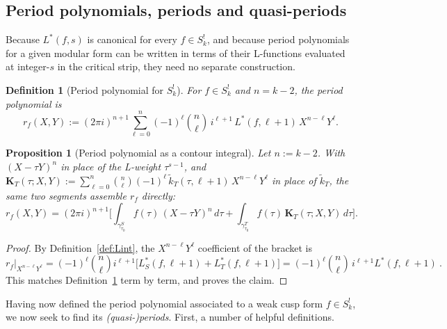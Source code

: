 \documentclass[11pt]{article}
\newtheorem{proposition}[theorem]{Proposition}
\newtheorem{definition}[theorem]{Definition}
\newcommand{\tk}{\widetilde{k}_T}
\begin{document}
\subsection{Period polynomials, periods and quasi-periods}

Because $L^*(f,s)$ is canonical for every $f\in S^!_k$, and because period polynomials 
for a given modular form can be written in terms of their L-functions evaluated at integer-$s$ 
in the critical strip, they need no separate construction.

\begin{definition}[Period polynomial for $S_k^!$]\label{def:rf}
For $f\in S^!_k$ and $n=k-2$, the \emph{period polynomial} is
\begin{equation}
r_f(X,Y):=(2\pi i)^{n+1}\sum_{\ell=0}^{n}(-1)^\ell\binom{n}{\ell}\,i^{\ell+1}\,L^*(f,\ell+1)\,X^{n-\ell}Y^\ell.
\end{equation}
\end{definition}

\begin{proposition}[Period polynomial as a contour integral]\label{prop:periodint}
Let $n:=k-2$. With $(X-\tau Y)^n$ in place of the L-weight $\tau^{s-1}$, and
$\mathbf K_T(\tau;X,Y):=\sum_{\ell=0}^{n}\binom{n}{\ell}(-1)^\ell\,\tk(\tau,\ell+1)\,X^{n-\ell}Y^\ell$
in place of $\tk$, the same two segments assemble $r_f$ directly:
\begin{equation}\label{eq:rf}
r_f(X, Y)=(2\pi i)^{n+1}\Big[\int_{\gamma^S_{\tau_0}} f(\tau)\,(X-\tau Y)^n\,d\tau
+\int_{\gamma^T_{\tau_0}} f(\tau)\,\mathbf K_T(\tau;X,Y)\,d\tau\Big].
\end{equation}
\end{proposition}
\begin{proof}
By Definition~\ref{def:Lint}, the $X^{n-\ell}Y^\ell$ coefficient of the bracket is
\begin{equation}
r_f|_{X^{n-\ell}Y^\ell} = (-1)^\ell\binom{n}{\ell} i^{\ell+1} 
\big[
L^*_S(f, \ell+1) 
+
L^*_T(f, \ell+1)
\big]
=(-1)^\ell\binom{n}{\ell}\,i^{\ell+1}L^*(f,\ell+1)~.
\end{equation}
This matches Definition~\ref{def:rf} term by term, and proves the claim.
\end{proof}

Having now defined the period polynomial associated to a weak cusp form $f \in S_k^!$,
we now seek to find its {\em (quasi-)periods}. First, a number of helpful definitions.
\end{document}
